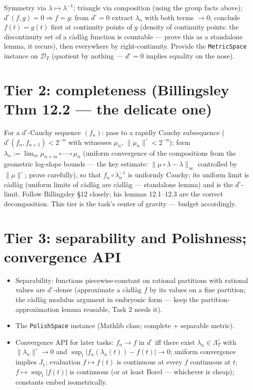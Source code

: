 \documentclass[11pt]{article}
\theoremstyle{plain}
\theoremstyle{remark}
\newcommand{\D}{\mathcal D}\newcommand{\norm}[1]{\lVert #1\rVert}
\begin{document}
Symmetry via $\lambda\mapsto\lambda^{-1}$; triangle via composition (using the
group facts above); $d^\circ(f,g)=0\Rightarrow f=g$: from $d^\circ=0$ extract
$\lambda_n$ with both terms $\to0$; conclude $f(t)=g(t)$ first at continuity
points of $g$ (density of continuity points: the discontinuity set of a
c\`adl\`ag function is countable --- prove this as a standalone lemma, it
recurs), then everywhere by right-continuity. Provide the
\texttt{MetricSpace} instance on $\D_T$ (quotient by nothing --- $d^\circ=0$
implies equality on the nose).

\section*{Tier 2: completeness (Billingsley Thm 12.2 --- the delicate one)}

For a $d^\circ$-Cauchy sequence $(f_n)$: pass to a rapidly Cauchy subsequence
($d^\circ(f_n,f_{n+1})<2^{-n}$ with witnesses $\mu_n$,
$\norm{\mu_n}^\circ<2^{-n}$); form $\lambda_n:=\lim_{m}\mu_{n+m}\circ\cdots
\circ\mu_n$ (uniform convergence of the compositions from the geometric
log-slope bounds --- the key estimate: $\norm{\mu\circ\lambda-\lambda}_\infty$
controlled by $\norm\mu^\circ$; prove carefully), so that
$f_n\circ\lambda_n^{-1}$ is uniformly Cauchy; its uniform limit is c\`adl\`ag
(uniform limits of c\`adl\`ag are c\`adl\`ag --- standalone lemma) and is the
$d^\circ$-limit. Follow Billingsley \S12 closely; his lemmas 12.1--12.3 are
the correct decomposition. This tier is the task's center of gravity ---
budget accordingly.

\section*{Tier 3: separability and Polishness; convergence API}

\begin{itemize}
\item[(a)] Separability: functions piecewise-constant on rational partitions
with rational values are $d^\circ$-dense (approximate a c\`adl\`ag $f$ by its
values on a fine partition; the c\`adl\`ag modulus argument in embryonic form
--- keep the partition-approximation lemma reusable, Task 2 needs it).
\item[(b)] The \texttt{PolishSpace} instance (Mathlib class; complete + separable
metric).
\item[(c)] Convergence API for later tasks: $f_n\to f$ in $d^\circ$ iff there
exist $\lambda_n\in\Lambda^\circ_T$ with $\norm{\lambda_n}^\circ\to0$ and
$\sup_t|f_n(\lambda_n(t))-f(t)|\to0$; uniform convergence implies $J_1$;
evaluation $f\mapsto f(t)$ is continuous at every $f$ continuous at $t$;
$f\mapsto\sup_t|f(t)|$ is continuous (or at least Borel --- whichever is
cheap); constants embed isometrically.
\end{itemize}
\end{document}
